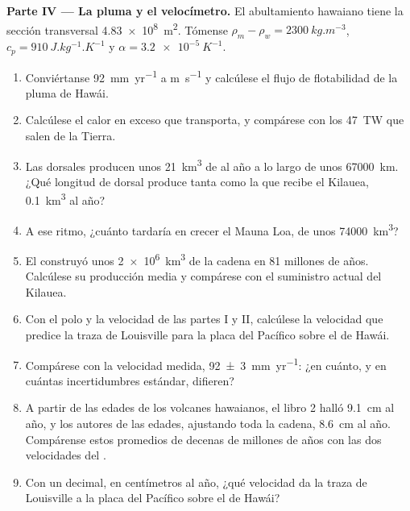 \begin{problem}
\medskip
\noindent\textbf{Parte IV --- La pluma y el velocímetro.} El abultamiento hawaiano tiene la sección transversal \qty{4.83e8}{m^2}. Tómense
$\rho_m - \rho_w = \qty{2300}{kg.m^{-3}}$, $c_p = \qty{910}{J.kg^{-1}.K^{-1}}$
y $\alpha = \qty{3.2e-5}{K^{-1}}$.
\begin{enumerate}[resume]
  \item Conviértanse \qty{92}{mm.yr^{-1}} a \unit{m.s^{-1}} y calcúlese el flujo de flotabilidad de la pluma de Hawái.
  \item Calcúlese el calor en exceso que transporta, y compárese con los \qty{47}{TW} que salen de la Tierra.
  \item Las dorsales producen unos \qty{21}{km^3} de  al año a lo largo de unos \qty{67000}{km}. ¿Qué longitud de dorsal produce tanta 
        como la que recibe el Kilauea, \qty{0.1}{km^3} al año?
  \item A ese ritmo, ¿cuánto tardaría en crecer el Mauna Loa, de unos \qty{74000}{km^3}?
  \item El  construyó unos \qty{2e6}{km^3} de la cadena en 81 millones de años. Calcúlese su producción media y compárese con el suministro
        actual del Kilauea.
  \item Con el polo y la velocidad de las partes I y II, calcúlese la velocidad que predice la traza de Louisville para la placa del Pacífico sobre el
         de Hawái.
  \item Compárese con la velocidad medida, \qty[uncertainty-mode=separate]{92 \pm 3}{mm.yr^{-1}}: ¿en cuánto, y en cuántas incertidumbres estándar,
        difieren?
  \item A partir de las edades de los volcanes hawaianos, el libro 2 halló \qty{9.1}{cm} al año, y los autores de las edades, ajustando toda la cadena,
        \qty{8.6}{cm} al año. Compárense estos promedios de decenas de millones de años con las dos velocidades del .
  \item Con un decimal, en centímetros al año, ¿qué velocidad da la traza de Louisville a la placa del Pacífico sobre el  de Hawái?
\end{enumerate}
\end{problem}
